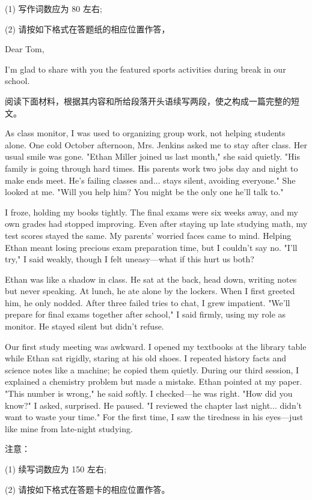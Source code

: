 \documentclass{英语试卷}
\begin{document}
\par (1) 写作词数应为 80 左右;\par
\par (2) 请按如下格式在答题纸的相应位置作答，\par
\par Dear Tom,\par
\par I'm glad to share with you the featured sports activities during break in our school.\par
{}
\par 阅读下面材料，根据其内容和所给段落开头语续写两段，使之构成一篇完整的短文。\par
\par As class monitor, I was used to organizing group work, not helping students alone. One cold October afternoon, Mrs. Jenkins asked me to stay after class. Her usual smile was gone. "Ethan Miller joined us last month," she said quietly. "His family is going through hard times. His parents work two jobs day and night to make ends meet. He's failing classes and... stays silent, avoiding everyone." She looked at me. "Will you help him? You might be the only one he'll talk to."\par
\par I froze, holding my books tightly. The final exams were six weeks away, and my own grades had stopped improving. Even after staying up late studying math, my test scores stayed the same. My parents' worried faces came to mind. Helping Ethan meant losing precious exam preparation time, but I couldn't say no. "I'll try," I said weakly, though I felt uneasy—what if this hurt us both?\par
\par Ethan was like a shadow in class. He sat at the back, head down, writing notes but never speaking. At lunch, he ate alone by the lockers. When I first greeted him, he only nodded. After three failed tries to chat, I grew impatient. "We'll prepare for final exams together after school," I said firmly, using my role as monitor. He stayed silent but didn't refuse.\par
\par Our first study meeting was awkward. I opened my textbooks at the library table while Ethan sat rigidly, staring at his old shoes. I repeated history facts and science notes like a machine; he copied them quietly. During our third session, I explained a chemistry problem but made a mistake. Ethan pointed at my paper. "This number is wrong," he said softly. I checked—he was right. "How did you know?" I asked, surprised. He paused. "I reviewed the chapter last night... didn't want to waste your time." For the first time, I saw the tiredness in his eyes—just like mine from late-night studying.\par
\par 注意：\par
\par (1) 续写词数应为 150 左右;\par
\par (2) 请按如下格式在答题卡的相应位置作答。\par
{}
\end{document}
